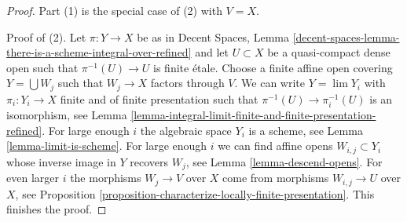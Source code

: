 \documentclass{stacks-project}
\theoremstyle{plain}
\theoremstyle{definition}
\theoremstyle{remark}
\numberwithin{equation}{subsection}
\def\lim{\mathop{\mathrm{lim}}\nolimits}
\begin{document}
\begin{proof}
Part (1) is the special case of (2) with $V = X$.

\medskip\noindent
Proof of (2). Let $\pi : Y \to X$ be as in Decent Spaces, Lemma
\ref{decent-spaces-lemma-there-is-a-scheme-integral-over-refined}
and let $U \subset X$ be a quasi-compact dense open such that
$\pi^{-1}(U) \to U$ is finite \'etale.
Choose a finite affine open covering $Y = \bigcup W_j$ such that
$W_j \to X$ factors through $V$. We can write $Y = \lim Y_i$ with
$\pi_i : Y_i \to X$ finite and of finite presentation such
that $\pi^{-1}(U) \to \pi_i^{-1}(U)$ is an isomorphism, see
Lemma \ref{lemma-integral-limit-finite-and-finite-presentation-refined}.
For large enough $i$ the algebraic space $Y_i$ is a scheme, see
Lemma \ref{lemma-limit-is-scheme}.
For large enough $i$ we can find affine opens $W_{i, j} \subset Y_i$
whose inverse image in $Y$ recovers $W_j$, see
Lemma \ref{lemma-descend-opens}.
For even larger $i$ the morphisms $W_j \to V$ over $X$ come
from morphisms $W_{i, j} \to U$ over $X$, see Proposition
\ref{proposition-characterize-locally-finite-presentation}.
This finishes the proof.
\end{proof}
\end{document}
